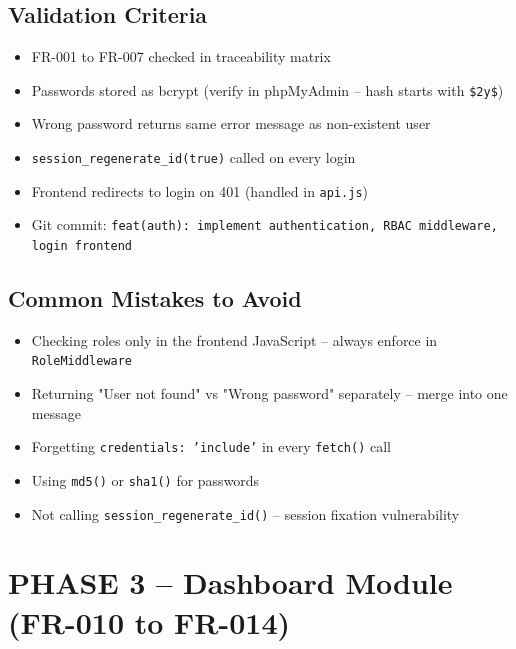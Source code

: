 \documentclass[11pt,a4paper]{report}
\newcommand{\todo}{\textcolor{helixamber}{\textbf{[ ]}}}
\newcommand{\filepath}[1]{\texttt{\small#1}}
\begin{document}
\section*{Validation Criteria}

\begin{itemize}
    \item[\todo] FR-001 to FR-007 checked in traceability matrix
    \item[\todo] Passwords stored as bcrypt (verify in phpMyAdmin -- hash starts with \texttt{\$2y\$})
    \item[\todo] Wrong password returns same error message as non-existent user
    \item[\todo] \texttt{session\_regenerate\_id(true)} called on every login
    \item[\todo] Frontend redirects to login on 401 (handled in \filepath{api.js})
    \item[\todo] Git commit: \texttt{feat(auth): implement authentication, RBAC middleware, login frontend}
\end{itemize}

\section*{Common Mistakes to Avoid}

\begin{warnbox}[title=Watch Out]
\begin{itemize}
    \item[$\times$] Checking roles only in the frontend JavaScript -- always enforce in \texttt{RoleMiddleware}
    \item[$\times$] Returning "User not found" vs "Wrong password" separately -- merge into one message
    \item[$\times$] Forgetting \texttt{credentials: 'include'} in every \texttt{fetch()} call
    \item[$\times$] Using \texttt{md5()} or \texttt{sha1()} for passwords
    \item[$\times$] Not calling \texttt{session\_regenerate\_id()} -- session fixation vulnerability
\end{itemize}
\end{warnbox}

\chapter{PHASE 3 -- Dashboard Module (FR-010 to FR-014)}
\end{document}
